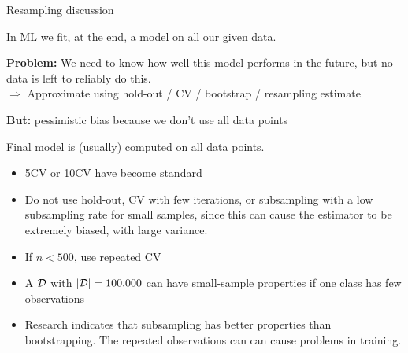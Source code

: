 \documentclass[11pt,compress,t,notes=noshow, xcolor=table]{beamer}
\begin{document}
% 

\begin{vbframe}{Resampling discussion}

In ML we fit, at the end, a model on all our given data.\\

\lz

\textbf{Problem:} We need to know how well this model performs in the future, 
but no data is left to reliably do this.\\

$\Rightarrow$ Approximate using hold-out / CV / bootstrap / resampling estimate\\ 

\lz

\textbf{But:} pessimistic bias because we don't use all data points\\

\lz 

Final model is (usually) computed on all data points.


\framebreak

\begin{itemize}
  \item 5CV or 10CV have become standard
  \item Do not use hold-out, CV with few iterations, or subsampling with a low subsampling rate for small samples, since this can cause the estimator to be extremely biased, with large variance.
  \item If $n < 500$, use 
  repeated CV
  \item A $\mathcal{D}$ with $|\mathcal{D}| = 100.000$ can have small-sample properties if one class has few observations 
  \item Research indicates that subsampling has better properties than
    bootstrapping. The repeated observations can can cause problems in training.
\end{itemize}
\end{vbframe}

\endlecture
\end{document}
